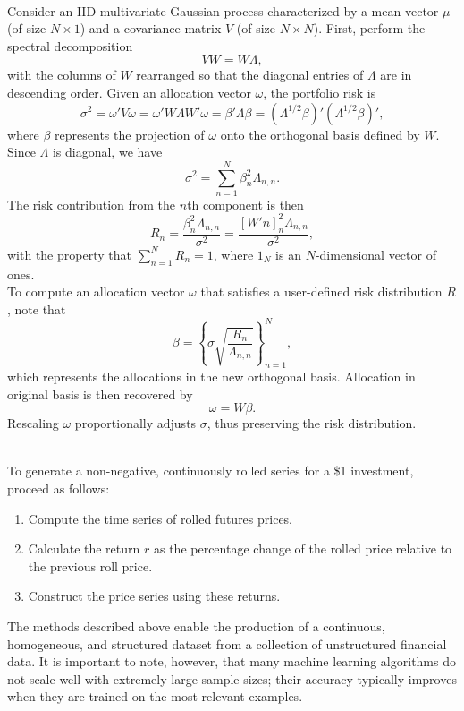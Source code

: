 \begin{method} \\
Consider an IID multivariate Gaussian process characterized by a mean vector $\mu$ (of size $N \times 1$) and a covariance matrix $V$ (of size $N \times N$). First, perform the spectral decomposition
\[ VW = W \Lambda, \]
with the columns of $W$ rearranged so that the diagonal entries of $\Lambda$ are in descending order. Given an allocation vector $\omega$, the portfolio risk is
\[ \sigma^2 = \omega' V \omega = \omega' W \Lambda W' \omega = \beta' \Lambda \beta = (\Lambda^{1/2} \beta)'(\Lambda^{1/2} \beta)', \]
where $\beta$ represents the projection of $\omega$ onto the orthogonal basis defined by $W$. Since $\Lambda$ is diagonal, we have
\[ \sigma^2 = \sum_{n=1}^N \beta_n^2 \Lambda_{n,n}. \]
The risk contribution from the $n$th component is then
\[ R_n = \frac{\beta_n^2 \Lambda_{n,n}}{\sigma^2} = \frac{[W' n]^2_n \Lambda_{n,n}}{\sigma^2}, \]
with the property that $\sum_{n=1}^N R_n = 1$, where $1_N$ is an $N$-dimensional vector of ones.\\
To compute an allocation vector $\omega$ that satisfies a user-defined risk distribution $R$, note that
\[ \beta = \left\{ \sigma \sqrt{\frac{R_n}{\Lambda_{n,n}}} \right\}_{n = 1}^{N}, \]
which represents the allocations in the new orthogonal basis. Allocation in original basis is then recovered by
\[ \omega = W \beta. \]
Rescaling $\omega$ proportionally adjusts $\sigma$, thus preserving the risk distribution.
\end{method}

\begin{method} \\
To generate a non-negative, continuously rolled series for a \$1 investment, proceed as follows:
\begin{enumerate}[label=\roman*.]
\setlength{\itemsep}{0pt}
\item Compute the time series of rolled futures prices.
\item Calculate the return $r$ as the percentage change of the rolled price relative to the previous roll price.
\item Construct the price series using these returns.
\end{enumerate}
\end{method}

The methods described above enable the production of a continuous, homogeneous, and structured dataset from a collection of unstructured financial data. It is important to note, however, that many machine learning algorithms do not scale well with extremely large sample sizes; their accuracy typically improves when they are trained on the most relevant examples.

